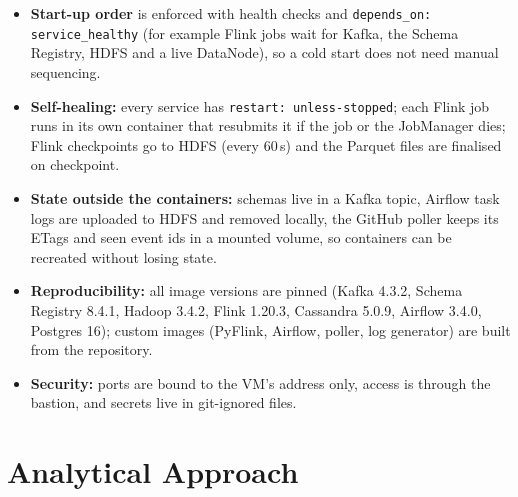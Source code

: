 \documentclass[11pt,a4paper]{article}
\begin{document}
\begin{itemize}
  \item \textbf{Start-up order} is enforced with health checks and \texttt{depends\_on: service\_healthy} (for example Flink jobs wait for Kafka, the Schema Registry,
        HDFS and a live DataNode), so a cold start does not need manual sequencing.
  \item \textbf{Self-healing:} every service has \texttt{restart: unless-stopped}; each Flink job runs in its own container that resubmits it if the job or
        the JobManager dies; Flink checkpoints go to HDFS (every 60\,s) and the Parquet files are finalised on checkpoint.
  \item \textbf{State outside the containers:} schemas live in a Kafka topic, Airflow task logs are uploaded to HDFS and removed locally, the
        GitHub poller keeps its ETags and seen event ids in a mounted volume, so containers can be recreated without losing state.
  \item \textbf{Reproducibility:} all image versions are pinned (Kafka 4.3.2, Schema Registry 8.4.1, Hadoop 3.4.2, Flink 1.20.3, Cassandra 5.0.9,
        Airflow 3.4.0, Postgres 16); custom images (PyFlink, Airflow, poller, log generator) are built from the repository.
  \item \textbf{Security:} ports are bound to the VM's address only, access is through the bastion, and secrets live in git-ignored files.
\end{itemize}

\section{Analytical Approach}\label{sec:analytics}
\end{document}
